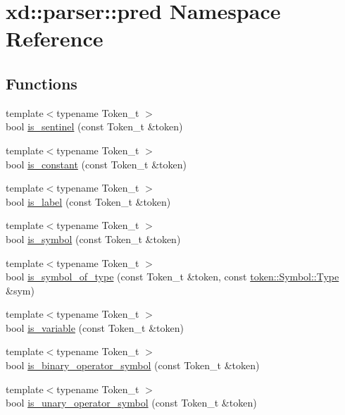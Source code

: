 \hypertarget{namespacexd_1_1parser_1_1pred}{}\section{xd\+:\+:parser\+:\+:pred Namespace Reference}
\label{namespacexd_1_1parser_1_1pred}
\subsection*{Functions}
\begin{DoxyCompactItemize}
\item 
{\footnotesize template$<$typename Token\+\_\+t $>$ }\\bool \mbox{\hyperlink{namespacexd_1_1parser_1_1pred_aa68f76bb0da46b5d4392a3acb5098c0e}{is\+\_\+sentinel}} (const Token\+\_\+t \&token)
\item 
{\footnotesize template$<$typename Token\+\_\+t $>$ }\\bool \mbox{\hyperlink{namespacexd_1_1parser_1_1pred_abee53e1f056107ec126152aab7a24827}{is\+\_\+constant}} (const Token\+\_\+t \&token)
\item 
{\footnotesize template$<$typename Token\+\_\+t $>$ }\\bool \mbox{\hyperlink{namespacexd_1_1parser_1_1pred_a2bf54f011a9ef2dbcfffb13dc3682690}{is\+\_\+label}} (const Token\+\_\+t \&token)
\item 
{\footnotesize template$<$typename Token\+\_\+t $>$ }\\bool \mbox{\hyperlink{namespacexd_1_1parser_1_1pred_a84b45d8cbaa3e33f7f8f9c7c9ba6164f}{is\+\_\+symbol}} (const Token\+\_\+t \&token)
\item 
{\footnotesize template$<$typename Token\+\_\+t $>$ }\\bool \mbox{\hyperlink{namespacexd_1_1parser_1_1pred_ad3c7f43fc9d10192b7d46a76339e25d1}{is\+\_\+symbol\+\_\+of\+\_\+type}} (const Token\+\_\+t \&token, const \mbox{\hyperlink{classxd_1_1parser_1_1token_1_1_symbol_a1ccd1a684e22809f543b496a29564483}{token\+::\+Symbol\+::\+Type}} \&sym)
\item 
{\footnotesize template$<$typename Token\+\_\+t $>$ }\\bool \mbox{\hyperlink{namespacexd_1_1parser_1_1pred_ae39d823b3569686e71e5950c97e0e7a6}{is\+\_\+variable}} (const Token\+\_\+t \&token)
\item 
{\footnotesize template$<$typename Token\+\_\+t $>$ }\\bool \mbox{\hyperlink{namespacexd_1_1parser_1_1pred_a4f406be2c42ccba4d6c237785b5c063c}{is\+\_\+binary\+\_\+operator\+\_\+symbol}} (const Token\+\_\+t \&token)
\item 
{\footnotesize template$<$typename Token\+\_\+t $>$ }\\bool \mbox{\hyperlink{namespacexd_1_1parser_1_1pred_ab5c403e13ae1078e7fff805d3b7f5001}{is\+\_\+unary\+\_\+operator\+\_\+symbol}} (const Token\+\_\+t \&token)
\end{DoxyCompactItemize}


